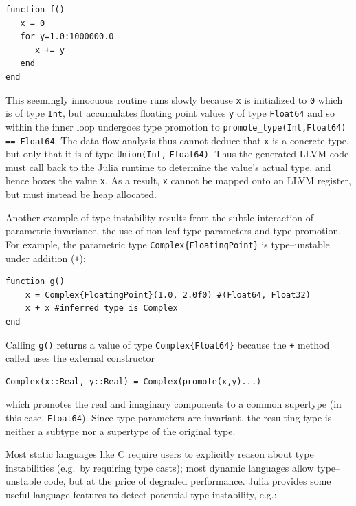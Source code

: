 \documentclass[pldi]{sigplanconf-pldi15}
\begin{document}
\begin{lstlisting}
function f()
   x = 0
   for y=1.0:1000000.0
      x += y
   end
end
\end{lstlisting}
%
This seemingly innocuous routine runs slowly because \verb|x| is initialized to
\verb|0| which is of type \verb|Int|, but accumulates floating point values
\verb|y| of type \verb|Float64| and so within the inner loop undergoes type
promotion to \verb|promote_type(Int,Float64)| \verb|== Float64|. The data flow
analysis thus cannot deduce that \verb|x| is a concrete type, but only that it
is of type \verb|Union(Int,| \verb|Float64)|. Thus the generated LLVM code must
call back to the Julia runtime to determine the value's actual type, and hence
boxes the value \verb|x|. As a result, \verb|x| cannot be mapped onto an LLVM
register, but must instead be heap allocated.

Another example of type instability results from the subtle interaction of
parametric invariance, the use of non-leaf type parameters and type promotion.
For example, the parametric type \verb|Complex{FloatingPoint}| is
type--unstable under addition (\verb|+|):

\begin{lstlisting}
function g()
    x = Complex{FloatingPoint}(1.0, 2.0f0) #(Float64, Float32)
    x + x #inferred type is Complex
end
\end{lstlisting}
%
Calling \verb|g()| returns a value of type \verb|Complex{Float64}| because the
\verb|+| method called uses the external constructor

\begin{lstlisting}
Complex(x::Real, y::Real) = Complex(promote(x,y)...)
\end{lstlisting}
%
which promotes the real and imaginary components to a common supertype (in this
case, \verb|Float64|). Since type parameters are invariant, the resulting type
is neither a subtype nor a supertype of the original type.

Most static languages like C require users to explicitly reason about type
instabilities (e.g.\ by requiring type casts); most dynamic languages allow
type--unstable code, but at the price of degraded performance. Julia provides
some useful language features to detect potential type instability, e.g.:
\end{document}
